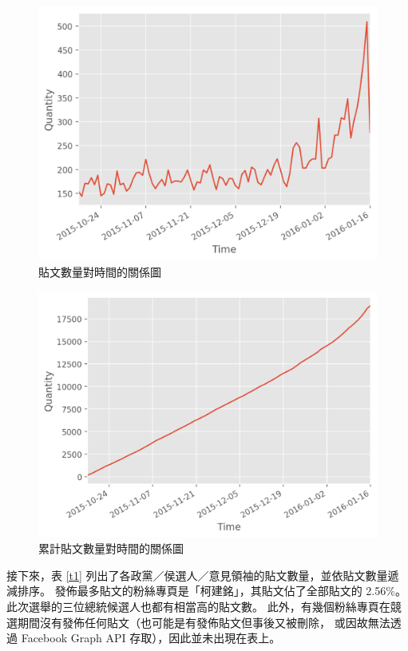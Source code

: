 \documentclass[a4paper, 10pt, conference]{ieeeconf}       %
\begin{document}
\begin{CJK}{UTF8}{bsmi}
\begin{figure}[!htbp]
\centering
\includegraphics[width=\columnwidth]{quantity_time_graph}
\caption{貼文數量對時間的關係圖}
\label{f1}
\end{figure}

\begin{figure}[!htbp]
\centering
\includegraphics[width=\columnwidth]{quantity_time_cumulative_graph}
\caption{累計貼文數量對時間的關係圖}
\label{f2}
\end{figure}

接下來，表 \ref{t1} 列出了各政黨／侯選人／意見領袖的貼文數量，並依貼文數量遞減排序。%
發佈最多貼文的粉絲專頁是「柯建銘」，其貼文佔了全部貼文的 2.56\%。%
此次選舉的三位總統候選人也都有相當高的貼文數。%
此外，有幾個粉絲專頁在競選期間沒有發佈任何貼文（也可能是有發佈貼文但事後又被刪除，%
或因故無法透過 Facebook Graph API 存取），因此並未出現在表上。%


\end{CJK}
\end{document}
